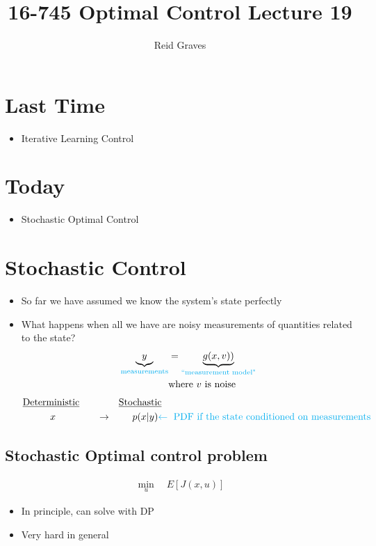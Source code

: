 \documentclass[11pt]{article}
\title{16-745 Optimal Control Lecture 19}
\author{Reid Graves}
\begin{document}
\maketitle

\section*{Last Time}
\begin{itemize}
    \item Iterative Learning Control
\end{itemize}

\section*{Today}
\begin{itemize}
    \item Stochastic Optimal Control
\end{itemize}


\section*{Stochastic Control}
\begin{itemize}
    \item So far we have assumed we know the system's state perfectly
    \item What happens when all we have are noisy measurements of quantities related to the state?
    \begin{align*}
    \underbrace{y}_{\textcolor{cyan}{\text{measurements}}} &= \underbrace{g(x,v))}_{\textcolor{cyan}{\text{``measurement model"}}}
    \\
    &\text{where } v \text{ is noise}
    \end{align*}
    \begin{align*}
        & \underline{\text{Deterministic}} & &\underline{\text{Stochastic}}
        \\
        & \hspace{10mm} x  \hspace{15mm}\rightarrow &&\hspace{5mm}  p(x|y)\textcolor{cyan}{\leftarrow\text{ PDF if the state conditioned on measurements}}
    \end{align*}
\end{itemize}


\subsection*{Stochastic Optimal control problem}
\begin{align*}
    \min_u \quad E[J(x,u)]
\end{align*}
\begin{itemize}
    \item In principle, can solve with DP
    \item Very hard in general
\end{itemize}
\end{document}
